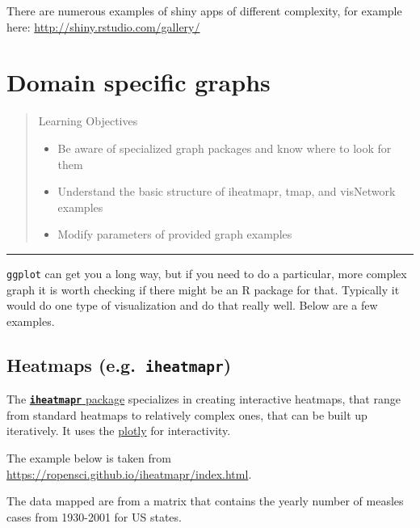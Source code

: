 \documentclass[]{book}
\providecommand{\tightlist}{%
  \setlength{\itemsep}{0pt}\setlength{\parskip}{0pt}}
\begin{document}
There are numerous examples of shiny apps of different complexity, for example here: \url{http://shiny.rstudio.com/gallery/}

\hypertarget{domains}{%
\chapter{Domain specific graphs}\label{domains}}

\begin{quote}
Learning Objectives

\begin{itemize}
\tightlist
\item
  Be aware of specialized graph packages and know where to look for them
\item
  Understand the basic structure of iheatmapr, tmap, and visNetwork examples
\item
  Modify parameters of provided graph examples
\end{itemize}
\end{quote}

\begin{center}\rule{0.5\linewidth}{\linethickness}\end{center}

\texttt{ggplot} can get you a long way, but if you need to do a particular, more complex graph it is worth checking if there might be an R package for that. Typically it would do one type of visualization and do that really well. Below are a few examples.

\hypertarget{heatmaps-e.g.-iheatmapr}{%
\section{\texorpdfstring{Heatmaps (e.g.~\textbf{\texttt{iheatmapr}})}{Heatmaps (e.g.~iheatmapr)}}\label{heatmaps-e.g.-iheatmapr}}

The \href{https://CRAN.R-project.org/package=iheatmapr}{\textbf{\texttt{iheatmapr}} package} specializes in creating interactive heatmaps, that range from standard heatmaps to relatively complex ones, that can be built up iteratively. It uses the \href{https://plot.ly/}{plotly} for interactivity.

The example below is taken from \url{https://ropensci.github.io/iheatmapr/index.html}.

The data mapped are from a matrix that contains the yearly number of measles cases from 1930-2001 for US states.
\end{document}
